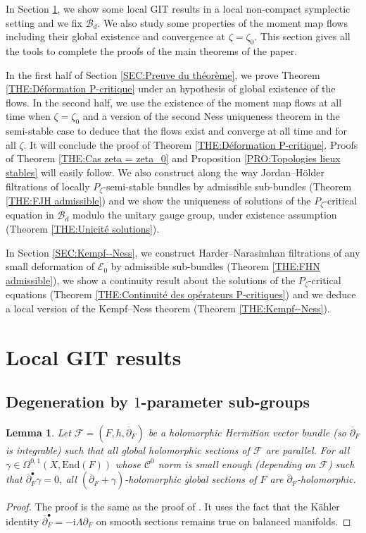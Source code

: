 \documentclass{article}
\newtheorem{lemma}[theorem]{Lemma}
\theoremstyle{remark}
\theoremstyle{definition}
\newcommand{\End}{\mathrm{End}}
\renewcommand{\i}{\boldsymbol{\mathrm{i}}}
\newcommand{\E}{\mathcal{E}}
\newcommand{\F}{\mathcal{F}}
\newcommand{\mB}{\mathcal{B}}
\newcommand{\mC}{\mathcal{C}}
\newcommand{\dbar}{\overline{\partial}}
\begin{document}
In Section \ref{SEC:Résultats GIT locaux}, we show some local GIT results in a local non-compact symplectic setting and we fix $\mB_d$. We also study some properties of the moment map flows including their global existence and convergence at $\zeta = \zeta_0$. This section gives all the tools to complete the proofs of the main theorems of the paper.

In the first half of Section \ref{SEC:Preuve du théorème}, we prove Theorem \ref{THE:Déformation P-critique} under an hypothesis of global existence of the flows. In the second half, we use the existence of the moment map flows at all time when $\zeta = \zeta_0$ and a version of the second Ness uniqueness theorem in the semi-stable case to deduce that the flows exist and converge at all time and for all $\zeta$. It will conclude the proof of Theorem \ref{THE:Déformation P-critique}. Proofs of Theorem \ref{THE:Cas zeta = zeta_0} and Proposition \ref{PRO:Topologies lieux stables} will easily follow. We also construct along the way Jordan--Hölder filtrations of locally $P_\zeta$-semi-stable bundles by admissible sub-bundles (Theorem \ref{THE:FJH admissible}) and we show the uniqueness of solutions of the $P_\zeta$-critical equation in $\mB_d$ modulo the unitary gauge group, under existence assumption (Theorem \ref{THE:Unicité solutions}).

In Section \ref{SEC:Kempf--Ness}, we construct Harder--Narasimhan filtrations of any small deformation of $\E_0$ by admissible sub-bundles (Theorem \ref{THE:FHN admissible}), we show a continuity result about the solutions of the $P_\zeta$-critical equations (Theorem \ref{THE:Continuité des opérateurs P-critiques}) and we deduce a local version of the Kempf--Ness theorem (Theorem \ref{THE:Kempf--Ness}).

\section{Local GIT results}\label{SEC:Résultats GIT locaux}

\subsection{Degeneration by $1$-parameter sub-groups}

\begin{lemma}\label{LEM:Sections dbar + alpha holomorphes}
    Let $\F = (F,h,\dbar_F)$ be a holomorphic Hermitian vector bundle (so $\dbar_F$ is integrable) such that all global holomorphic sections of $\F$ are parallel. For all $\gamma \in \Omega^{0,1}(X,\End(F))$ whose $\mC^0$ norm is small enough (depending on $\F$) such that $\dbar_F^\bullet\gamma = 0$, all $(\dbar_F + \gamma)$-holomorphic global sections of $F$ are $\dbar_F$-holomorphic.
\end{lemma}
\begin{proof}
The proof is the same as the proof of \cite[Proposition 4.5]{Buchdahl_Schumacher}. It uses the fact that the Kähler identity $\dbar_F^\bullet = -\i\Lambda\partial_F$ on smooth sections remains true on balanced manifolds.
\end{proof}
\end{document}
